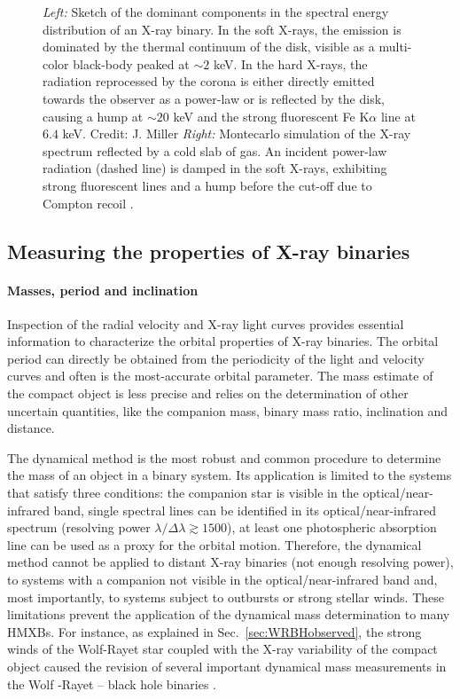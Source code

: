 \documentclass[a4paper,titlepage]{book}     	%
\begin{document}
\begin{figure}
\begin{minipage}{.42\textwidth}
	\end{minipage}
	\caption{\emph{Left:} Sketch of the dominant components in the spectral energy distribution of an X-ray binary. In the soft X-rays, the emission is dominated by the thermal continuum of the disk, visible as a multi-color black-body peaked at $\sim 2$ keV. In the hard X-rays, the radiation reprocessed by the corona is either directly emitted towards the observer as a power-law or is reflected by the disk, causing a hump at $\sim 20$ keV and the strong fluorescent Fe K$\alpha$ line at $6.4$ keV. Credit: J. Miller \emph{Right:} Montecarlo simulation of the X-ray spectrum reflected by a cold slab of gas. An incident power-law radiation (dashed line) is damped in the soft X-rays, exhibiting strong fluorescent lines and a hump before the cut-off due to Compton recoil \cite{FeKalphaline_Fabian2000}.}\label{fig:accretiondisk}
\end{figure}

\subsection{Measuring the properties of  X-ray binaries}\label{subsec:Xraymeasure}
\paragraph{Masses, period and inclination}
Inspection of the radial velocity and X-ray light curves provides essential information to characterize the orbital properties of X-ray binaries. The orbital period can directly be obtained from the periodicity of the light and velocity curves and often is the most-accurate orbital parameter. The mass estimate of the compact object is less precise and relies on the determination of other uncertain quantities, like the companion mass, binary mass ratio, inclination and distance.

The dynamical method is the most robust and common procedure to determine the mass of an object in a binary system. Its application is limited to the systems that satisfy three conditions: the companion star is visible in the optical/near-infrared band, single spectral lines can be identified in its optical/near-infrared spectrum (resolving power $\lambda/\Delta \lambda \gtrsim 1500$), at least one photospheric absorption line can be used as a proxy for the orbital motion. Therefore, the dynamical method cannot be applied to distant X-ray binaries (not enough resolving power), to systems with a companion not visible in the optical/near-infrared band and, most importantly, to systems subject to outbursts or strong stellar winds. These limitations prevent the application of the dynamical mass determination to many HMXBs. For instance, as explained in Sec.\ \ref{sec:WRBHobserved}, the strong winds of the  Wolf-Rayet star coupled with the X-ray variability of the compact object caused the revision of several important dynamical mass measurements in the Wolf -Rayet -- black hole binaries \cite{ICX10X-1_Laycock2015_revisited}.
\end{document}
